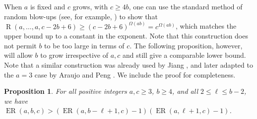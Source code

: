 \documentclass[11pt]{article}
\theoremstyle{plain}
\newtheorem{proposition}[theorem]{Proposition}
\theoremstyle{definition}
\newcommand{\offerado}[3]{\operatorname{ER}(#1,#2,#3)}
\begin{document}
When $a$ is fixed and $c$ grows, with $c\ge 4b$, one can use the standard method of random blow-ups (see, for example, \cite{wigderson2021improved}) to show that $\operatorname{R}(a,\dots,a,c-2b+6)\ge (c-2b+6)^{\Omega(ab)}=c^{\Omega(ab)}$, which matches the upper bound up to a constant in the exponent. Note that this construction does not permit $b$ to be too large in terms of $c$. The following proposition, however, will allow $b$ to grow irrespective of $a,c$ and still give a comparable lower bound. Note that a similar construction was already used by Jiang \cite{jiang2009canonical}, and later adapted to the $a=3$ case by Araujo and Peng \cite{araujo2024off}. We include the proof for completeness.

\begin{proposition}\label{prop-lower-offerado-blowup}
    For all positive integers $a,c\ge 3$, $b\ge4$, and all $2\le \ell\le b-2$, we have $\offerado abc> (\offerado{a}{b-\ell+1}{c}-1)(\offerado{a}{\ell+1}{c}-1)$.
\end{proposition}
\end{document}

